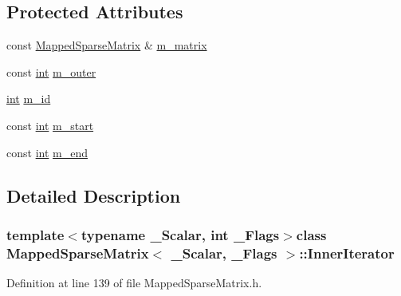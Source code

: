 \subsection*{Protected Attributes}
\begin{DoxyCompactItemize}
\item 
const \hyperlink{class_mapped_sparse_matrix}{Mapped\-Sparse\-Matrix} \& \hyperlink{class_mapped_sparse_matrix_1_1_inner_iterator_a4b68f0f4484a05012906f8e728c4ce69}{m\-\_\-matrix}
\item 
const \hyperlink{ioapi_8h_a787fa3cf048117ba7123753c1e74fcd6}{int} \hyperlink{class_mapped_sparse_matrix_1_1_inner_iterator_a4b0d95329bd5a88ba6b5c84126ed2c15}{m\-\_\-outer}
\item 
\hyperlink{ioapi_8h_a787fa3cf048117ba7123753c1e74fcd6}{int} \hyperlink{class_mapped_sparse_matrix_1_1_inner_iterator_aa0525d021c270d8f6cf867028b0699ce}{m\-\_\-id}
\item 
const \hyperlink{ioapi_8h_a787fa3cf048117ba7123753c1e74fcd6}{int} \hyperlink{class_mapped_sparse_matrix_1_1_inner_iterator_a03b2d3eed69004d889c8e35ff0521402}{m\-\_\-start}
\item 
const \hyperlink{ioapi_8h_a787fa3cf048117ba7123753c1e74fcd6}{int} \hyperlink{class_mapped_sparse_matrix_1_1_inner_iterator_a7d907189dc2dd590c52733de2cea6252}{m\-\_\-end}
\end{DoxyCompactItemize}


\subsection{Detailed Description}
\subsubsection*{template$<$typename \-\_\-\-Scalar, int \-\_\-\-Flags$>$class Mapped\-Sparse\-Matrix$<$ \-\_\-\-Scalar, \-\_\-\-Flags $>$\-::\-Inner\-Iterator}



Definition at line 139 of file Mapped\-Sparse\-Matrix.\-h.



